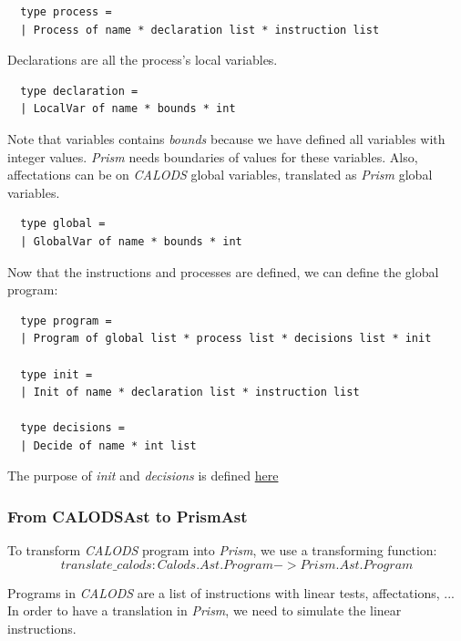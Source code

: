 \documentclass{article}
\begin{document}
\begin{lstlisting}
  type process =
  | Process of name * declaration list * instruction list
\end{lstlisting}
Declarations are all the process's local variables.
\begin{lstlisting}
  type declaration =
  | LocalVar of name * bounds * int
\end{lstlisting}
Note that variables contains \textit{bounds} because we have defined all variables with integer values. \textit{Prism} needs boundaries of values for these variables. Also, affectations can be on \textit{CALODS} global variables, translated as \textit{Prism} global variables.
\begin{lstlisting}
  type global =
  | GlobalVar of name * bounds * int
\end{lstlisting}
Now that the instructions and processes are defined, we can define the global program:
\begin{lstlisting}
  type program =
  | Program of global list * process list * decisions list * init
  
  type init =
  | Init of name * declaration list * instruction list
    
  type decisions =
  | Decide of name * int list
\end{lstlisting}
The purpose of \textit{init} and \textit{decisions} is defined \hyperref[sec:init]{here}




\subsubsection{From CALODSAst to PrismAst}
To transform \textit{CALODS} program into \textit{Prism}, we use a transforming function:
  $$ translate\_calods : Calods.Ast.Program -> Prism.Ast.Program $$

Programs in \textit{CALODS} are a list of instructions with linear tests, affectations, ... In order to have a translation in \textit{Prism}, we need to simulate the linear instructions.
\end{document}
